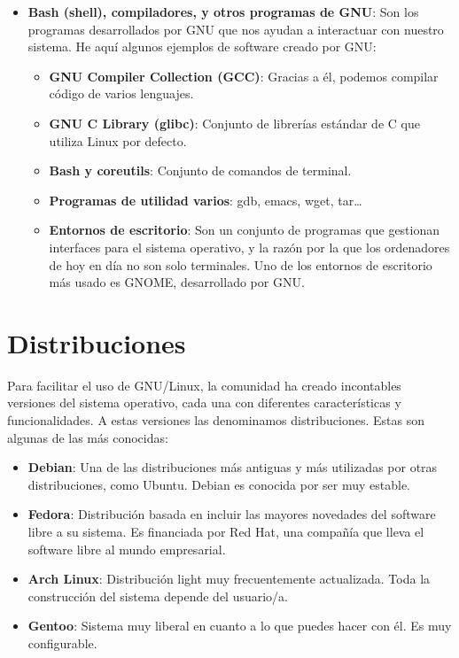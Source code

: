 \begin{itemize}
    \item \textbf{Bash (shell), compiladores, y otros programas de GNU}: Son los programas desarrollados por GNU que nos ayudan a interactuar con nuestro sistema. He aquí algunos ejemplos de software creado por GNU:

    \begin{itemize}
        \item \textbf{GNU Compiler Collection (GCC)}: Gracias a él, podemos compilar código de varios lenguajes.
        \item \textbf{GNU C Library (glibc)}: Conjunto de librerías estándar de C que utiliza Linux por defecto.
        \item \textbf{Bash y coreutils}: Conjunto de comandos de terminal.
        \item \textbf{Programas de utilidad varios}: gdb, emacs, wget, tar…
        \item \textbf{Entornos de escritorio}: Son un conjunto de programas que gestionan interfaces para el sistema operativo, y la razón por la que los ordenadores de hoy en día no son solo terminales. Uno de los entornos de escritorio más usado es GNOME, desarrollado por GNU.
    \end{itemize}
\end{itemize}

\section{Distribuciones}
Para facilitar el uso de GNU/Linux, la comunidad ha creado incontables versiones del sistema operativo, cada una con diferentes características y funcionalidades. A estas versiones las denominamos distribuciones. Estas son algunas de las más conocidas:

\begin{itemize}
    \item \textbf{Debian}: Una de las distribuciones más antiguas y más utilizadas por otras distribuciones, como Ubuntu. Debian es conocida por ser muy estable.
    \item \textbf{Fedora}: Distribución basada en incluir las mayores novedades del software libre a su sistema. Es financiada por Red Hat, una compañía que lleva el software libre al mundo empresarial.
    \item \textbf{Arch Linux}: Distribución light muy frecuentemente actualizada. Toda la construcción del sistema depende del usuario/a. 
    \item \textbf{Gentoo}: Sistema muy liberal en cuanto a lo que puedes hacer con él. Es muy configurable.
\end{itemize}
